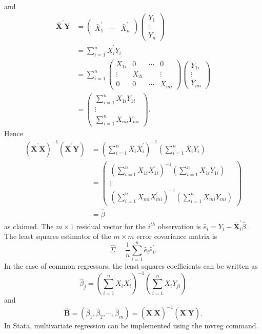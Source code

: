 \documentclass[10pt]{article}
\begin{document}
and
$$
\begin{aligned}
\overline{\boldsymbol{X}}^{\prime} \boldsymbol{Y} &=\left(\begin{array}{ccc}
\bar{X}_{1}^{\prime} & \cdots & \bar{X}_{n}^{\prime}
\end{array}\right)\left(\begin{array}{c}
Y_{1} \\
\vdots \\
Y_{n}
\end{array}\right) \\
&=\sum_{i=1}^{n} \bar{X}_{i}^{\prime} Y_{i} \\
&=\sum_{i=1}^{n}\left(\begin{array}{cccc}
X_{1 i} & 0 & \cdots & 0 \\
\vdots & X_{2 i} & & \vdots \\
0 & 0 & \cdots & X_{m i}
\end{array}\right)\left(\begin{array}{c}
Y_{1 i} \\
\vdots \\
Y_{m i}
\end{array}\right) \\
&=\left(\begin{array}{c}
\sum_{i=1}^{n} X_{1 i} Y_{1 i} \\
\vdots \\
\sum_{i=1}^{n} X_{m i} Y_{m i}
\end{array}\right) .
\end{aligned}
$$
Hence
$$
\begin{aligned}
\left(\overline{\boldsymbol{X}}^{\prime} \overline{\boldsymbol{X}}\right)^{-1}\left(\overline{\boldsymbol{X}}^{\prime} \boldsymbol{Y}\right) &=\left(\sum_{i=1}^{n} \bar{X}_{i} \bar{X}_{i}^{\prime}\right)^{-1}\left(\sum_{i=1}^{n} \bar{X}_{i} Y_{i}\right) \\
&=\left(\begin{array}{c}
\left(\sum_{i=1}^{n} X_{1 i} X_{1 i}^{\prime}\right)^{-1}\left(\sum_{i=1}^{n} X_{1 i} Y_{1 i}\right) \\
\vdots \\
\left(\sum_{i=1}^{n} X_{m i} X_{m i}^{\prime}\right)^{-1}\left(\sum_{i=1}^{n} X_{m i} Y_{m i}\right)
\end{array}\right) \\
&=\widehat{\beta}
\end{aligned}
$$
as claimed. The $m \times 1$ residual vector for the $i^{t h}$ observation is $\widehat{e}_{i}=Y_{i}-\overline{\boldsymbol{X}}_{i}^{\prime} \widehat{\beta}$. The least squares estimator of the $m \times m$ error covariance matrix is
$$
\widehat{\Sigma}=\frac{1}{n} \sum_{i=1}^{n} \widehat{e}_{i} \widehat{e}_{i}^{\prime} .
$$
In the case of common regressors, the least squares coefficients can be written as
$$
\widehat{\beta}_{j}=\left(\sum_{i=1}^{n} X_{i} X_{i}^{\prime}\right)^{-1}\left(\sum_{i=1}^{n} X_{i} Y_{j i}\right)
$$
and
$$
\widehat{\boldsymbol{B}}=\left(\widehat{\beta}_{1}, \widehat{\beta}_{2}, \cdots, \widehat{\beta}_{m}\right)=\left(\boldsymbol{X}^{\prime} \boldsymbol{X}\right)^{-1}\left(\boldsymbol{X}^{\prime} \boldsymbol{Y}\right) .
$$
In Stata, multivariate regression can be implemented using the mvreg command.
\end{document}
